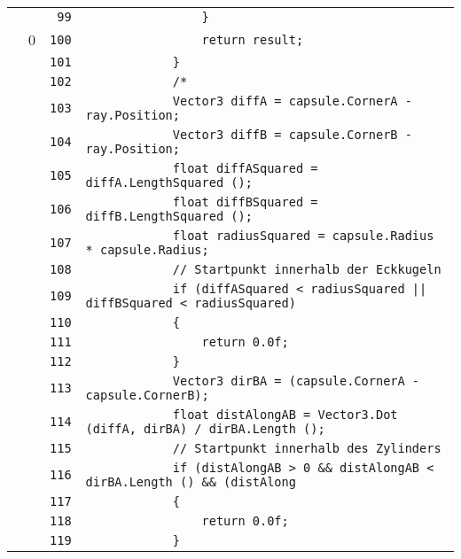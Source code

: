 \documentclass[a4paper,10pt]{article}
\begin{document}
\begin{longtable}[l]{lrrl}
\cellcolor{gray} &  & \verb~99~ & \verb~                }~\\
\cellcolor{red} & 0 & \verb~100~ & \verb~                return result;~\\
\cellcolor{gray} &  & \verb~101~ & \verb~            }~\\
\cellcolor{gray} &  & \verb~102~ & \verb~            /*~\\
\cellcolor{gray} &  & \verb~103~ & \verb~            Vector3 diffA = capsule.CornerA - ray.Position;~\\
\cellcolor{gray} &  & \verb~104~ & \verb~            Vector3 diffB = capsule.CornerB - ray.Position;~\\
\cellcolor{gray} &  & \verb~105~ & \verb~            float diffASquared = diffA.LengthSquared ();~\\
\cellcolor{gray} &  & \verb~106~ & \verb~            float diffBSquared = diffB.LengthSquared ();~\\
\cellcolor{gray} &  & \verb~107~ & \verb~            float radiusSquared = capsule.Radius * capsule.Radius;~\\
\cellcolor{gray} &  & \verb~108~ & \verb~            // Startpunkt innerhalb der Eckkugeln~\\
\cellcolor{gray} &  & \verb~109~ & \verb~            if (diffASquared < radiusSquared || diffBSquared < radiusSquared)~\\
\cellcolor{gray} &  & \verb~110~ & \verb~            {~\\
\cellcolor{gray} &  & \verb~111~ & \verb~                return 0.0f;~\\
\cellcolor{gray} &  & \verb~112~ & \verb~            }~\\
\cellcolor{gray} &  & \verb~113~ & \verb~            Vector3 dirBA = (capsule.CornerA - capsule.CornerB);~\\
\cellcolor{gray} &  & \verb~114~ & \verb~            float distAlongAB = Vector3.Dot (diffA, dirBA) / dirBA.Length ();~\\
\cellcolor{gray} &  & \verb~115~ & \verb~            // Startpunkt innerhalb des Zylinders~\\
\cellcolor{gray} &  & \verb~116~ & \verb~            if (distAlongAB > 0 && distAlongAB < dirBA.Length () && (distAlong~\\
\cellcolor{gray} &  & \verb~117~ & \verb~            {~\\
\cellcolor{gray} &  & \verb~118~ & \verb~                return 0.0f;~\\
\cellcolor{gray} &  & \verb~119~ & \verb~            }~\\

\end{longtable}
\end{document}
